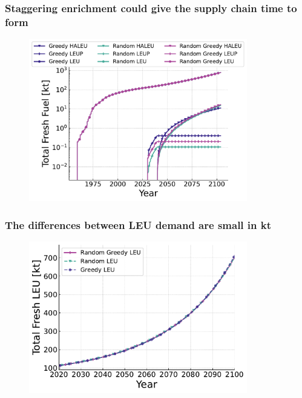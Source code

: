 \documentclass[9pt]{beamer}
\begin{document}
\begin{frame}
  \frametitle{Staggering enrichment could give the supply chain time to form}
  \begin{figure}
      \centering
      \includegraphics[width=0.85\textwidth]{../images/total_fuel_over_time.pdf}
  \end{figure}
\end{frame}

\begin{frame}
  \frametitle{The differences between LEU demand are small in kt}
  \begin{figure}
      \centering
      \includegraphics[width=0.85\textwidth]{../images/total_leu_over_time.pdf}
  \end{figure}
\end{frame}
\end{document}
